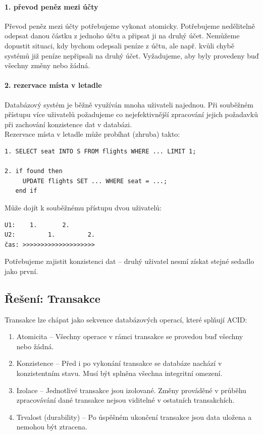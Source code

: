 \documentclass[10pt,a4paper]{article}
\begin{document}
\paragraph{1. převod peněz mezi účty}
Převod peněz mezi účty potřebujeme vykonat atomicky. Potřebujeme nedělitelně odepsat danou částku z jednoho účtu a připsat ji na druhý účet. Nemůžeme dopustit situaci, kdy bychom odepsali peníze z účtu, ale např. kvůli chybě systémů již peníze nepřipsali na druhý účet. Vyžadujeme, aby byly provedeny buď všechny změny nebo žádná.
\paragraph{2. rezervace místa v letadle}
Databázový systém je běžně využíván mnoha uživateli najednou. Při souběžném přístupu více uživatelů požadujeme co nejefektivnější zpracování jejich požadavků při zachování konzistence dat v databázi.
\\[12pt]Rezervace místa v letadle může probíhat (zhruba) takto:
\begin{lstlisting}
1. SELECT seat INTO S FROM flights WHERE ... LIMIT 1;
	
2. if found then
     UPDATE flights SET ... WHERE seat = ...;
   end if
\end{lstlisting}
Může dojít k souběžnému přístupu dvou uživatelů:
\begin{verbatim}
U1:    1.       2.
U2:         1.         2.
čas: >>>>>>>>>>>>>>>>>>>>
\end{verbatim}
Potřebujeme zajistit konzistenci dat – druhý uživatel nesmí získat stejné sedadlo jako první.
\newpage
\subsection*{Řešení: Transakce}
Transakce lze chápat jako sekvence databázových operací, které splňují ACID:
\begin{enumerate}
	\item Atomicita – Všechny operace v rámci transakce se provedou buď všechny nebo žádná.
	\item Konzistence – Před i po vykonání transakce se databáze nachází v konzistentním stavu. Musí být splněna všechna integritní omezení.
	\item Izolace – Jednotlivé transakce jsou izolované. Změny prováděné v průběhu zpracovávání dané transakce nejsou viditelné v ostatních transakchích.
	\item Trvalost (durability) – Po úspěšném ukončení transakce jsou data uložena a nemohou být ztracena.
\end{enumerate}
\end{document}
